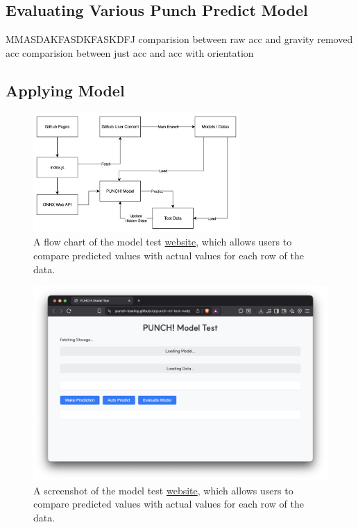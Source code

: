 \documentclass{article}
\begin{document}
\FloatBarrier
\subsection{Evaluating Various Punch Predict Model}

MMASDAKFASDKFASKDFJ
comparision between raw acc and gravity removed acc
comparision between just acc and acc with orientation


\FloatBarrier
\subsection{Applying Model}


\FloatBarrier
\begin{figure}[h]
    \centering
    \includegraphics[width=0.7\textwidth]{model_test_web_flow_chart.png}
    \caption{A flow chart of the model test \href{https://punch-boxing.github.io/punch-ml-test-web/}{website}, which allows users to compare predicted values with actual values for each row of the data.}
    \label{fig:model_test_web_flow_chart}
\end{figure}

\FloatBarrier
\begin{figure}[h]
    \centering
    \includegraphics[width=\textwidth]{model_test_web.png}
    \caption{A screenshot of the model test \href{https://punch-boxing.github.io/punch-ml-test-web/}{website}, which allows users to compare predicted values with actual values for each row of the data.}
    \label{fig:model_test_web}
\end{figure}
\end{document}
